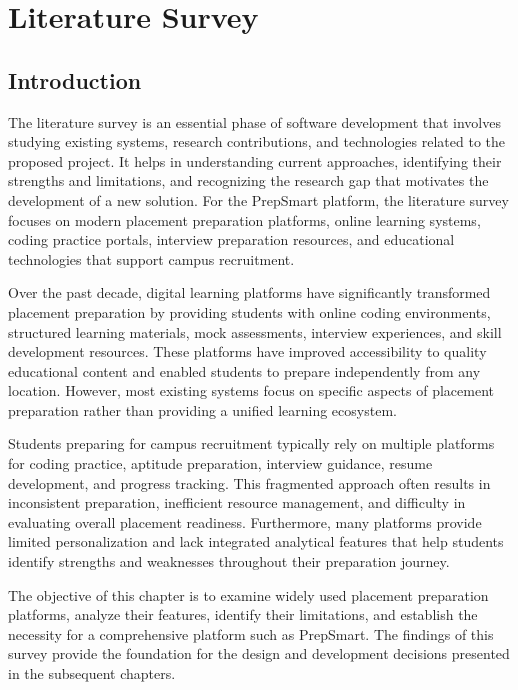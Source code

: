 \chapter{Literature Survey}

\section{Introduction}

The literature survey is an essential phase of software development that involves studying existing systems, research contributions, and technologies related to the proposed project. It helps in understanding current approaches, identifying their strengths and limitations, and recognizing the research gap that motivates the development of a new solution. For the PrepSmart platform, the literature survey focuses on modern placement preparation platforms, online learning systems, coding practice portals, interview preparation resources, and educational technologies that support campus recruitment.

Over the past decade, digital learning platforms have significantly transformed placement preparation by providing students with online coding environments, structured learning materials, mock assessments, interview experiences, and skill development resources. These platforms have improved accessibility to quality educational content and enabled students to prepare independently from any location. However, most existing systems focus on specific aspects of placement preparation rather than providing a unified learning ecosystem.

Students preparing for campus recruitment typically rely on multiple platforms for coding practice, aptitude preparation, interview guidance, resume development, and progress tracking. This fragmented approach often results in inconsistent preparation, inefficient resource management, and difficulty in evaluating overall placement readiness. Furthermore, many platforms provide limited personalization and lack integrated analytical features that help students identify strengths and weaknesses throughout their preparation journey.

The objective of this chapter is to examine widely used placement preparation platforms, analyze their features, identify their limitations, and establish the necessity for a comprehensive platform such as PrepSmart. The findings of this survey provide the foundation for the design and development decisions presented in the subsequent chapters.


